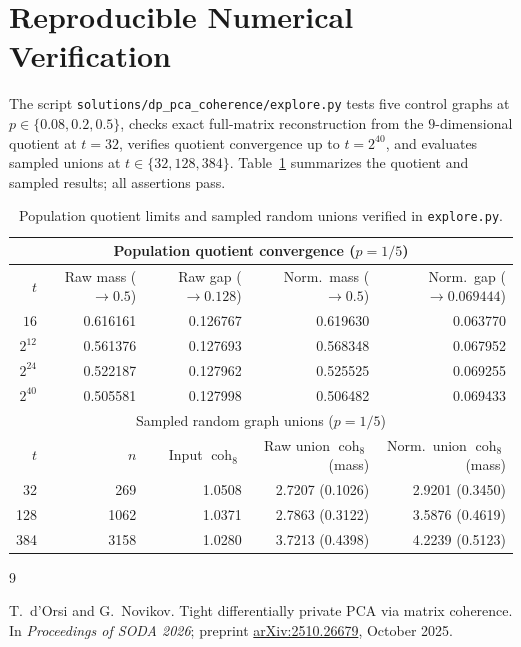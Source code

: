 \documentclass[11pt]{article}
\theoremstyle{plain}
\theoremstyle{definition}
\theoremstyle{remark}
\DeclareMathOperator{\coh}{coh}
\begin{document}
\section{Reproducible Numerical Verification}

The script \texttt{solutions/dp\_pca\_coherence/explore.py} tests five control graphs at $p \in \{0.08, 0.2, 0.5\}$, checks exact full-matrix reconstruction from the $9$-dimensional quotient at $t = 32$, verifies quotient convergence up to $t = 2^{40}$, and evaluates sampled unions at $t \in \{32, 128, 384\}$. Table~\ref{tab:dppca} summarizes the quotient and sampled results; all assertions pass.

\begin{table}[htbp]
\centering
\small
\begin{tabular}{@{}rrrrr@{}}
\toprule
\multicolumn{5}{c}{Population quotient convergence ($p = 1/5$)} \\
\midrule
$t$ & Raw mass ($\to 0.5$) & Raw gap ($\to 0.128$) & Norm.\ mass ($\to 0.5$) & Norm.\ gap ($\to 0.069444$) \\
\midrule
$16$     & 0.616161 & 0.126767 & 0.619630 & 0.063770 \\
$2^{12}$ & 0.561376 & 0.127693 & 0.568348 & 0.067952 \\
$2^{24}$ & 0.522187 & 0.127962 & 0.525525 & 0.069255 \\
$2^{40}$ & 0.505581 & 0.127998 & 0.506482 & 0.069433 \\
\midrule
\multicolumn{5}{c}{Sampled random graph unions ($p = 1/5$)} \\
\midrule
$t$ & $n$ & Input $\coh_8$ & Raw union $\coh_8$ (mass) & Norm.\ union $\coh_8$ (mass) \\
\midrule
32  & 269  & 1.0508 & 2.7207 (0.1026) & 2.9201 (0.3450) \\
128 & 1062 & 1.0371 & 2.7863 (0.3122) & 3.5876 (0.4619) \\
384 & 3158 & 1.0280 & 3.7213 (0.4398) & 4.2239 (0.5123) \\
\bottomrule
\end{tabular}
\caption{Population quotient limits and sampled random unions verified in \texttt{explore.py}.}\label{tab:dppca}
\end{table}

\begin{thebibliography}{9}

T.~d'Orsi and G.~Novikov.
Tight differentially private PCA via matrix coherence.
In \emph{Proceedings of SODA 2026}; preprint \href{https://arxiv.org/abs/2510.26679}{arXiv:2510.26679}, October 2025.

\end{thebibliography}
\end{document}
